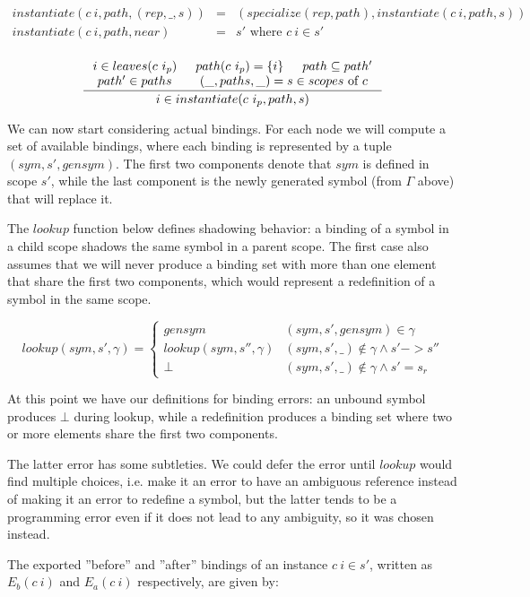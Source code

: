 \documentclass{kththesis}
\begin{document}
$$
\begin{array}{rcl}
instantiate(c~i, path, (rep, \_, s)) & = & (specialize(rep, path), instantiate(c~i, path, s)) \\
instantiate(c~i, path, near) & = & s' \text{ where } c~i \in s' \\
\end{array}
$$

$$
\inference{
  i \in leaves(c~i_p) &
  path(c~i_p) = \{i\} &
  path \subseteq path' \\
  path' \in paths &
  (\_, paths, \_) = s \in scopes \text{ of } c
}{i \in instantiate(c~i_p, path, s)}
$$

We can now start considering actual bindings. For each node we will compute a set of available bindings, where each binding is represented by a tuple $(sym, s', gensym)$. The first two components denote that $sym$ is defined in scope $s'$, while the last component is the newly generated symbol (from $\Gamma$ above) that will replace it.

The $lookup$ function below defines shadowing behavior: a binding of a symbol in a child scope shadows the same symbol in a parent scope. The first case also assumes that we will never produce a binding set with more than one element that share the first two components, which would represent a redefinition of a symbol in the same scope.

$$
lookup(sym, s', \gamma) =
\begin{cases}
gensym & (sym, s', gensym) \in \gamma \\
lookup(sym, s'', \gamma) & (sym, s', \_) \not\in \gamma \land s' -> s'' \\
\bot & (sym, s', \_) \not\in \gamma \land s' = s_r
\end{cases}
$$

At this point we have our definitions for binding errors: an unbound symbol produces $\bot$ during lookup, while a redefinition produces a binding set where two or more elements share the first two components.

The latter error has some subtleties. We could defer the error until $lookup$ would find multiple choices, i.e. make it an error to have an ambiguous reference instead of making it an error to redefine a symbol, but the latter tends to be a programming error even if it does not lead to any ambiguity, so it was chosen instead.

The exported ''before'' and ''after'' bindings of an instance $c~i \in s'$, written as $E_b(c~i)$ and $E_a(c~i)$ respectively, are given by:
\end{document}
